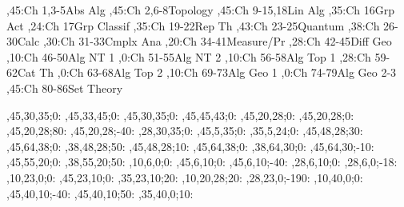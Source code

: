 
\bgroup
\renewcommand{\href}[1]{} %
\renewcommand{\solidwidth}{0.7pt}
\renewcommand{\boldwidth}{1.5pt}

\setcounter{diagheight}{50}
\begin{chart}
,45:{Ch 1,3-5}{Abs Alg}{}
,45:{Ch 2,6-8}{Topology}{}
,45:{Ch 9-15,18}{Lin Alg}{}
,35:{Ch 16}{Grp Act}{}
,24:{Ch 17}{Grp Classif}{}
,35:{Ch 19-22}{Rep Th}{}
,43:{Ch 23-25}{Quantum}{}
,38:{Ch 26-30}{Calc}{}
,30:{Ch 31-33}{Cmplx Ana}{}
,20:{Ch 34-41}{Measure/Pr}{}
,28:{Ch 42-45}{Diff Geo}{}
,10:{Ch 46-50}{Alg NT 1}{}
,0:{Ch 51-55}{Alg NT 2}{}
,10:{Ch 56-58}{Alg Top 1}{}
,28:{Ch 59-62}{Cat Th}{}
,0:{Ch 63-68}{Alg Top 2}{}
,10:{Ch 69-73}{Alg Geo 1}{}
,0:{Ch 74-79}{Alg Geo 2-3}{}
,45:{Ch 80-86}{Set Theory}{}

,45,30,35;0:    %
,45,33,45;0:    %
,45,30,35;0:    %
,45,45,43;0:    %
,45,20,28;0:    %
,45,20,28;0:    %
,45,20,28;80:   %
,45,20,28;-40:  %
,28,30,35;0:    %
,45,5,35;0:     %
,35,5,24;0:     %
,45,48,28;30:   %
,45,64,38;0:    %
,38,48,28;50:   %
,45,48,28;10:   %
,45,64,38;0:    %
,38,64,30;0:    %
,45,64,30;-10:  %
,45,55,20;0:    %
,38,55,20;50:   %
,10,6,0;0:       %
,45,6,10;0:     %
,45,6,10;-40:   %
,28,6,10;0:     %
,28,6,0;-18:    %
,10,23,0;0:     %
,45,23,10;0:    %
,35,23,10;20:   %
,10,20,28;20:    %
,28,23,0;-190:  %
,10,40,0;0:     %
,45,40,10;-40:  %
,45,40,10;50:   %
,35,40,0;10:    %
\end{chart}
\egroup
